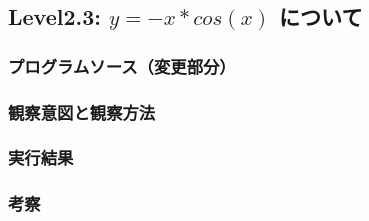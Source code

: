 \subsection{Level2.3: $y=-x*cos(x)$ について}
\subsubsection{プログラムソース（変更部分）}
\subsubsection{観察意図と観察方法}
\subsubsection{実行結果}
\subsubsection{考察}


